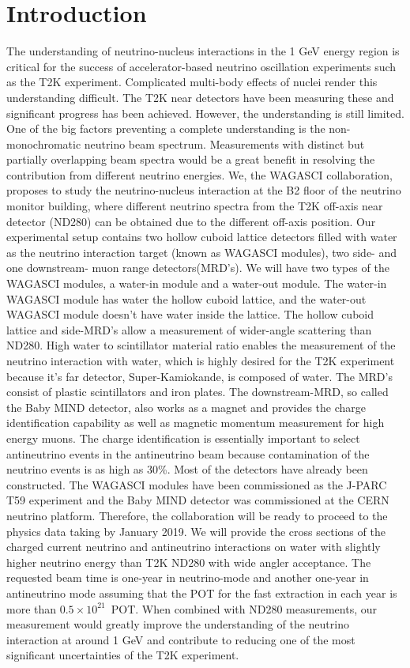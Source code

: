 \section{Introduction}

The understanding of neutrino-nucleus interactions in the 1 GeV energy region is critical for the success
of accelerator-based neutrino oscillation experiments such as the T2K experiment.
Complicated multi-body effects of nuclei render this understanding difficult.
The T2K near detectors have been measuring these and significant progress has been achieved.
However, the understanding is still limited.
One of the big factors preventing a complete understanding is the non-monochromatic neutrino beam spectrum.
Measurements with distinct but partially overlapping beam spectra would be a great benefit
in resolving the contribution from different neutrino energies.
We, the WAGASCI collaboration, proposes to study the neutrino-nucleus interaction
at the B2 floor of the neutrino monitor building, where different neutrino spectra from the T2K off-axis near detector (ND280) can be obtained due to the different off-axis position.
Our experimental setup contains two hollow cuboid lattice detectors filled with water as the neutrino interaction target (known as WAGASCI modules), two side- and one downstream- muon range detectors(MRD's).
We will have two types of the WAGASCI modules, a water-in module and a water-out module.
The water-in WAGASCI module has water the hollow cuboid lattice, and the water-out WAGASCI module doesn't have water inside the lattice.
The hollow cuboid lattice and side-MRD's allow a measurement of  wider-angle scattering than ND280.
High water to scintillator material ratio enables the measurement of the neutrino interaction with water, which is highly desired for the T2K experiment because it's far detector, Super-Kamiokande, is composed of water.
The MRD's consist of plastic scintillators and iron plates.
The downstream-MRD, so called the Baby MIND detector, also works as a magnet and provides the charge identification capability as well as magnetic momentum measurement for high energy muons.
The charge identification is essentially important to select antineutrino events in the antineutrino beam
because contamination of the neutrino events is as high as 30\%.
Most of the detectors have already been constructed.
The WAGASCI modules have been commissioned as the J-PARC T59 experiment and the Baby MIND detector was commissioned at the CERN neutrino platform.
Therefore, the collaboration will be ready to proceed to the physics data taking by January 2019.
We will provide the cross sections of the charged current neutrino and antineutrino interactions on water
with slightly higher neutrino energy than T2K ND280 with wide angler acceptance.
The requested beam time is one-year in neutrino-mode and another one-year in antineutrino mode
assuming that the POT for the fast extraction in each year is more than $0.5\times10^{21}$~POT.
When combined with ND280 measurements, our measurement would greatly improve the understanding of the neutrino interaction
at around 1 GeV 
and contribute to reducing one of the most significant uncertainties of the T2K experiment.

